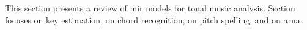 

This section presents a review of \gls{mir} models for tonal music analysis. Section  focuses on key estimation,  on chord recognition,  on pitch spelling, and  on \gls{arna}.
